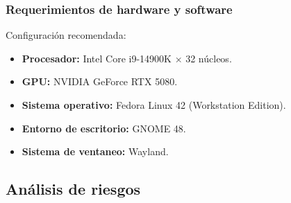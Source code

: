 \subsubsection{Requerimientos de hardware y software}

Configuración recomendada:

\begin{itemize}
	\item \textbf{Procesador:} Intel Core i9-14900K × 32 núcleos.
	\item \textbf{GPU:} NVIDIA GeForce RTX 5080.
	\item \textbf{Sistema operativo:} Fedora Linux 42 (Workstation Edition).
	\item \textbf{Entorno de escritorio:} GNOME 48.
	\item \textbf{Sistema de ventaneo:} Wayland. 
\end{itemize}

\subsection{Análisis de riesgos}

